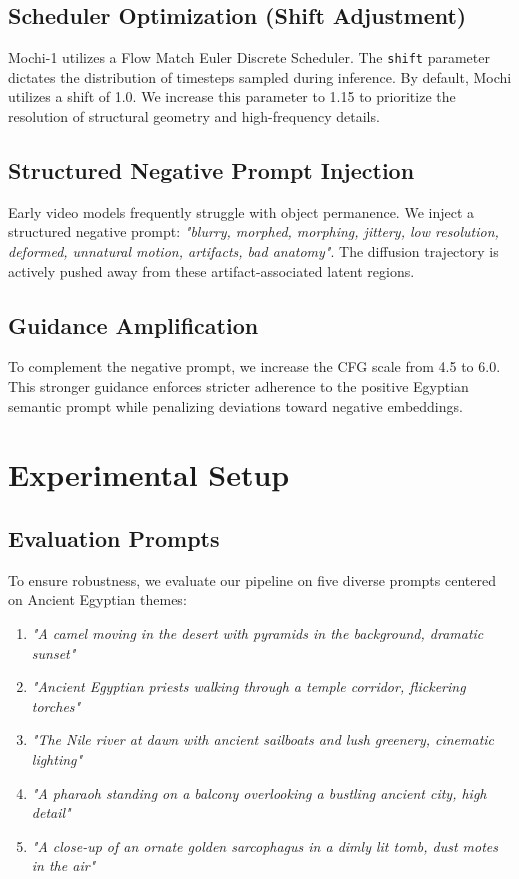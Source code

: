 \documentclass[10pt, conference]{IEEEtran}
\begin{document}
\subsection{Scheduler Optimization (Shift Adjustment)}
Mochi-1 utilizes a Flow Match Euler Discrete Scheduler. The \texttt{shift} parameter dictates the distribution of timesteps sampled during inference. By default, Mochi utilizes a shift of 1.0. We increase this parameter to 1.15 to prioritize the resolution of structural geometry and high-frequency details. 

\subsection{Structured Negative Prompt Injection}
Early video models frequently struggle with object permanence. We inject a structured negative prompt: \textit{"blurry, morphed, morphing, jittery, low resolution, deformed, unnatural motion, artifacts, bad anatomy"}. The diffusion trajectory is actively pushed away from these artifact-associated latent regions.

\subsection{Guidance Amplification}
To complement the negative prompt, we increase the CFG scale from 4.5 to 6.0. This stronger guidance enforces stricter adherence to the positive Egyptian semantic prompt while penalizing deviations toward negative embeddings.

\section{Experimental Setup}
\subsection{Evaluation Prompts}
To ensure robustness, we evaluate our pipeline on five diverse prompts centered on Ancient Egyptian themes:
\begin{enumerate}
    \item \textit{"A camel moving in the desert with pyramids in the background, dramatic sunset"}
    \item \textit{"Ancient Egyptian priests walking through a temple corridor, flickering torches"}
    \item \textit{"The Nile river at dawn with ancient sailboats and lush greenery, cinematic lighting"}
    \item \textit{"A pharaoh standing on a balcony overlooking a bustling ancient city, high detail"}
    \item \textit{"A close-up of an ornate golden sarcophagus in a dimly lit tomb, dust motes in the air"}
\end{enumerate}
\end{document}
